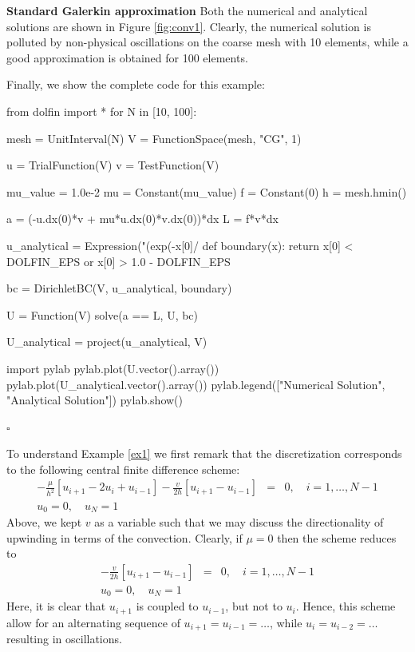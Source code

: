 \begin{example}{\textbf{Standard Galerkin approximation}}
Both the numerical and analytical solutions are shown in Figure \ref{fig:conv1}. Clearly, 
the numerical solution is polluted by non-physical oscillations on the coarse
mesh with 10 elements, while a good approximation is obtained for 100 elements.     


Finally, we show the complete code for this example: 
\begin{python}
from dolfin import *
for N in [10, 100]:

  mesh = UnitInterval(N)
  V = FunctionSpace(mesh, "CG", 1)

  u = TrialFunction(V)
  v = TestFunction(V)

  mu_value = 1.0e-2 
  mu = Constant(mu_value)
  f = Constant(0)
  h = mesh.hmin()

  a = (-u.dx(0)*v + mu*u.dx(0)*v.dx(0))*dx  
  L = f*v*dx  

  u_analytical = Expression("(exp(-x[0]/%
  def boundary(x):
      return x[0] < DOLFIN_EPS or x[0] > 1.0 - DOLFIN_EPS

  bc = DirichletBC(V, u_analytical, boundary) 

  U = Function(V)
  solve(a == L, U, bc) 

  U_analytical = project(u_analytical, V)

  import pylab 
  pylab.plot(U.vector().array())
  pylab.plot(U_analytical.vector().array())
  pylab.legend(["Numerical Solution", "Analytical Solution"])
  pylab.show()
\end{python}
$\square$ 
\end{example}

To understand Example \ref{ex1} we first remark that the discretization corresponds to the following 
central finite difference scheme: 
\begin{eqnarray*}
-\frac{\mu}{h^2}\left[u_{i+1}-2u_i+u_{i-1}\right] - 
\frac{v}{2h}\left[u_{i+1}-u_{i-1}\right] &=& 0, \quad i=1,\ldots,N-1\\
u_0=0,\quad u_N=1 &&
\end{eqnarray*}
Above, we kept $v$ as a variable such that we may discuss the directionality of upwinding in terms of the convection. 
Clearly, if $\mu=0$ then the scheme reduces to  
\begin{eqnarray*}
-\frac{v}{2h}\left[u_{i+1}-u_{i-1}\right] &=& 0, \quad i=1,\ldots,N-1\\
u_0=0,\quad u_N=1 &&
\end{eqnarray*}
Here, it is clear that $u_{i+1}$ is coupled to $u_{i-1}$, but not to 
$u_{i}$. 
Hence, this scheme allow for an alternating
sequence of $u_{i+1}=u_{i-1}=\ldots$, while $u_{i}=u_{i-2}=\ldots$
resulting in oscillations. 

